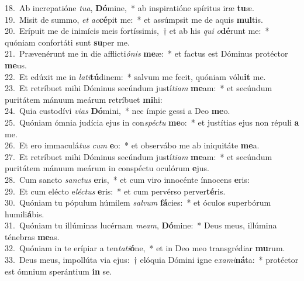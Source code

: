 {18.~}Ab increpatióne \textit{tu}\textit{a}, \textbf{Dó}mine,~* ab inspiratióne spíritus iræ \textbf{tu}æ.\\
{19.~}Misit de summo, \textit{et} \textit{ac}\textbf{cé}pit me:~* et assúmpsit me de aquis \textbf{mul}tis.\\
{20.~}Erípuit me de inimícis meis fortíssimis,~† et ab his \textit{qui} \textit{o}\textbf{dé}runt me:~* quóniam confortáti sunt \textbf{su}per me.\\
{21.~}Prævenérunt me in die afflicti\textit{ó}\textit{nis} \textbf{me}æ:~* et factus est Dóminus protéctor \textbf{me}us.\\
{22.~}Et edúxit me in \textit{la}\textit{ti}\textbf{tú}dinem:~* salvum me fecit, quóniam vólu\textbf{it} me.\\
{23.~}Et retríbuet mihi Dóminus secúndum justí\textit{ti}\textit{am} \textbf{me}am:~* et secúndum puritátem mánuum meárum retríbuet \textbf{mi}hi:\\
{24.~}Quia custodívi \textit{vi}\textit{as} \textbf{Dó}mini,~* nec ímpie gessi a Deo \textbf{me}o.\\
{25.~}Quóniam ómnia judícia ejus in con\textit{spé}\textit{ctu} \textbf{me}o:~* et justítias ejus non répuli \textbf{a} me.\\
{26.~}Et ero immaculá\textit{tus} \textit{cum} \textbf{e}o:~* et observábo me ab iniquitáte \textbf{me}a.\\
{27.~}Et retríbuet mihi Dóminus secúndum justí\textit{ti}\textit{am} \textbf{me}am:~* et secúndum puritátem mánuum meárum in conspéctu oculórum \textbf{e}jus.\\
{28.~}Cum sancto \textit{san}\textit{ctus} \textbf{e}ris,~* et cum viro innocénte ínnocens \textbf{e}ris:\\
{29.~}Et cum elécto e\textit{lé}\textit{ctus} \textbf{e}ris:~* et cum pervérso perver\textbf{té}ris.\\
{30.~}Quóniam tu pópulum húmilem \textit{sal}\textit{vum} \textbf{fá}cies:~* et óculos superbórum humili\textbf{á}bis.\\
{31.~}Quóniam tu illúminas lucérnam \textit{me}\textit{am}, \textbf{Dó}mine:~* Deus meus, illúmina ténebras \textbf{me}as.\\
{32.~}Quóniam in te erípiar a ten\textit{ta}\textit{ti}\textbf{ó}ne,~* et in Deo meo transgrédiar \textbf{mu}rum.\\
{33.~}Deus meus, impollúta via ejus:~† elóquia Dómini igne e\textit{xa}\textit{mi}\textbf{ná}ta:~* protéctor est ómnium sperántium \textbf{in} se.\\
